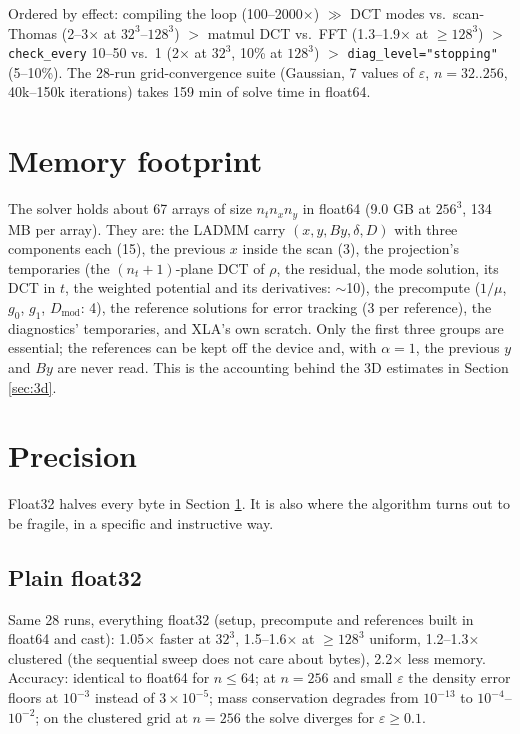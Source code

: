 \documentclass[11pt]{article}
\newcommand{\eps}{\varepsilon}
\newcommand{\code}[1]{\texttt{#1}}
\begin{document}
Ordered by effect: compiling the loop (100--2000$\times$) $\gg$ DCT modes vs.\ scan-Thomas
(2--3$\times$ at $32^3$--$128^3$) $>$ matmul DCT vs.\ FFT (1.3--1.9$\times$ at $\ge 128^3$)
$>$ \code{check\_every} 10--50 vs.\ 1 (2$\times$ at $32^3$, 10\% at $128^3$) $>$
\code{diag\_level="stopping"} (5--10\%). The 28-run grid-convergence suite (Gaussian,
7 values of $\eps$, $n=32..256$, 40k--150k iterations) takes 159 min of solve time in
float64.

\section{Memory footprint}\label{sec:memory}

The solver holds about 67 arrays of size $n_t n_x n_y$ in float64 (9.0 GB at $256^3$,
134 MB per array). They are: the LADMM carry $(x, y, By, \delta, D)$ with three
components each (15), the previous $x$ inside the scan (3), the projection's temporaries
(the $(n_t+1)$-plane DCT of $\rho$, the residual, the mode solution, its DCT in $t$, the
weighted potential and its derivatives: $\sim$10), the precompute ($1/\mu$, $g_0$, $g_1$,
$D_{\mathrm{mod}}$: 4), the reference solutions for error tracking (3 per reference), the
diagnostics' temporaries, and XLA's own scratch. Only the first three groups are
essential; the references can be kept off the device and, with $\alpha=1$, the previous
$y$ and $By$ are never read. This is the accounting behind the 3D estimates in
Section \ref{sec:3d}.

\section{Precision}\label{sec:precision}

Float32 halves every byte in Section \ref{sec:memory}. It is also where the algorithm
turns out to be fragile, in a specific and instructive way.

\subsection{Plain float32}

Same 28 runs, everything float32 (setup, precompute and references built in float64 and
cast): 1.05$\times$ faster at $32^3$, 1.5--1.6$\times$ at $\ge 128^3$ uniform,
1.2--1.3$\times$ clustered (the sequential sweep does not care about bytes), 2.2$\times$
less memory. Accuracy: identical to float64 for $n\le 64$; at $n=256$ and small $\eps$
the density error floors at $10^{-3}$ instead of $3\times10^{-5}$; mass conservation
degrades from $10^{-13}$ to $10^{-4}$--$10^{-2}$; on the clustered grid at $n=256$ the
solve diverges for $\eps\ge 0.1$.
\end{document}
